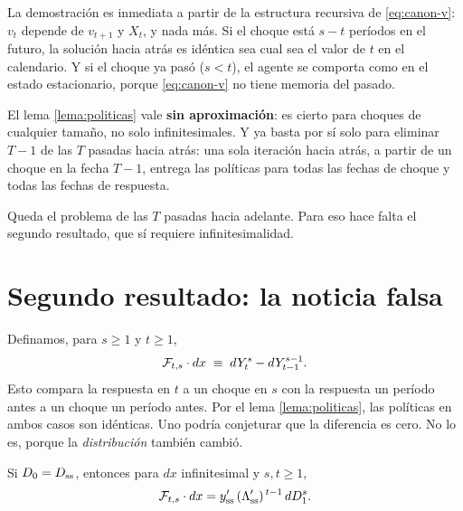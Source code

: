La demostración es inmediata a partir de la estructura recursiva de
\eqref{eq:canon-v}: $v_t$ depende de $v_{t+1}$ y $X_t$, y nada más. Si el choque
está $s-t$ períodos en el futuro, la solución hacia atrás es idéntica sea cual
sea el valor de $t$ en el calendario. Y si el choque ya pasó ($s<t$), el agente
se comporta como en el estado estacionario, porque \eqref{eq:canon-v} no tiene
memoria del pasado.

\begin{idea}
El lema \ref{lema:politicas} vale \textbf{sin aproximación}: es cierto para
choques de cualquier tamaño, no solo infinitesimales. Y ya basta por sí solo
para eliminar $T-1$ de las $T$ pasadas hacia atrás: una sola iteración hacia
atrás, a partir de un choque en la fecha $T-1$, entrega las políticas para todas
las fechas de choque y todas las fechas de respuesta.
\end{idea}

Queda el problema de las $T$ pasadas hacia adelante. Para eso hace falta el
segundo resultado, que sí requiere infinitesimalidad.

\section{Segundo resultado: la noticia falsa}

Definamos, para $s\ge1$ y $t\ge1$,
\begin{equation}
\mathcal{F}_{t,s}\cdot dx \;\equiv\; dY^s_t - dY^{s-1}_{t-1}.
\label{eq:def-F}
\end{equation}
Esto compara la respuesta en $t$ a un choque en $s$ con la respuesta un período
antes a un choque un período antes. Por el lema \ref{lema:politicas}, las
políticas en ambos casos son idénticas. Uno podría conjeturar que la diferencia
es cero. No lo es, porque la \emph{distribución} también cambió.

\begin{lema}
\label{lema:fake}
Si $D_0 = D_{\mathrm{ss}}$, entonces para $dx$ infinitesimal y $s,t\ge1$,
\begin{equation}
\mathcal{F}_{t,s}\cdot dx = y_{\mathrm{ss}}'\,(\Lambda_{\mathrm{ss}}')^{\,t-1}\, dD^s_1 .
\label{eq:lema2}
\end{equation}
\end{lema}

